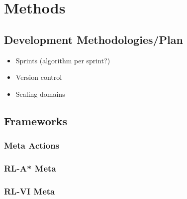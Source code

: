 \chapter{Methods}
\label{chapter2}

\section{Development Methodologies/Plan}
\begin{itemize}
    \item Sprints (algorithm per sprint?)
    \item Version control
    \item Scaling domains
\end{itemize}

\section{Frameworks}


\subsection{Meta Actions}

\subsection{RL-A* Meta}

\subsection{RL-VI Meta}